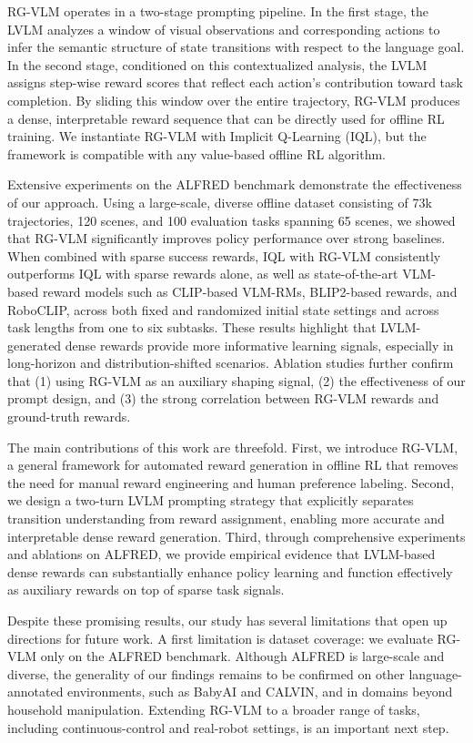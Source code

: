 \documentclass[master,english,final]{kaist-ucs}
\begin{document}
RG-VLM operates in a two-stage prompting pipeline. In the first stage, the LVLM analyzes a window of visual observations and corresponding actions to infer the semantic structure of state transitions with respect to the language goal. In the second stage, conditioned on this contextualized analysis, the LVLM assigns step-wise reward scores that reflect each action’s contribution toward task completion. By sliding this window over the entire trajectory, RG-VLM produces a dense, interpretable reward sequence that can be directly used for offline RL training. We instantiate RG-VLM with Implicit Q-Learning (IQL), but the framework is compatible with any value-based offline RL algorithm.

Extensive experiments on the ALFRED benchmark demonstrate the effectiveness of our approach. Using a large-scale, diverse offline dataset consisting of 73k trajectories, 120 scenes, and 100 evaluation tasks spanning 65 scenes, we showed that RG-VLM significantly improves policy performance over strong baselines. When combined with sparse success rewards, IQL with RG-VLM consistently outperforms IQL with sparse rewards alone, as well as state-of-the-art VLM-based reward models such as CLIP-based VLM-RMs, BLIP2-based rewards, and RoboCLIP, across both fixed and randomized initial state settings and across task lengths from one to six subtasks. These results highlight that LVLM-generated dense rewards provide more informative learning signals, especially in long-horizon and distribution-shifted scenarios. 
Ablation studies further confirm that (1) using RG-VLM as an auxiliary shaping signal, (2) the effectiveness of our prompt design, and (3) the strong correlation between RG-VLM rewards and ground-truth rewards.

The main contributions of this work are threefold. First, we introduce RG-VLM, a general framework for automated reward generation in offline RL that removes the need for manual reward engineering and human preference labeling. Second, we design a two-turn LVLM prompting strategy that explicitly separates transition understanding from reward assignment, enabling more accurate and interpretable dense reward generation. Third, through comprehensive experiments and ablations on ALFRED, we provide empirical evidence that LVLM-based dense rewards can substantially enhance policy learning and function effectively as auxiliary rewards on top of sparse task signals.

Despite these promising results, our study has several limitations that open up directions for future work. A first limitation is dataset coverage: we evaluate RG-VLM only on the ALFRED benchmark. Although ALFRED is large-scale and diverse, the generality of our findings remains to be confirmed on other language-annotated environments, such as BabyAI and CALVIN, and in domains beyond household manipulation. Extending RG-VLM to a broader range of tasks, including continuous-control and real-robot settings, is an important next step.
\end{document}

